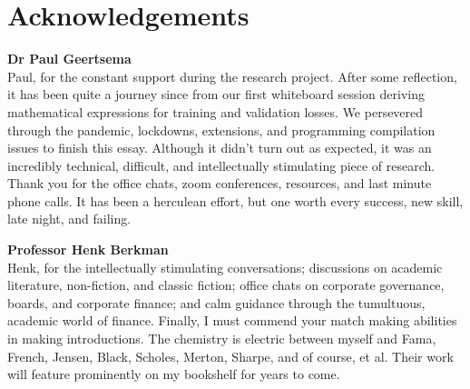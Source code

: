 \documentclass[12pt]{article}
\begin{document}
\section*{Acknowledgements}
\begin{center}
	\textbf{Dr Paul Geertsema}\\
	Paul, for the constant support during the research project.
	After some reflection, it has been quite a journey since from our first whiteboard session deriving mathematical expressions for training and validation losses.
	We persevered through the pandemic, lockdowns, extensions, and programming compilation issues to finish this essay.
	Although it didn't turn out as expected, it was an incredibly technical, difficult,
	and intellectually stimulating piece of research.
	Thank you for the office chats, zoom conferences, resources, and last minute phone calls.
	It has been a herculean effort, but one worth every success, new skill, late night, and failing.
\end{center}
\begin{center}
	\textbf{Professor Henk Berkman}\\
	Henk, for the intellectually stimulating conversations; discussions on academic literature, non-fiction, and classic fiction;
	office chats on corporate governance, boards, and corporate finance; and calm guidance through the tumultuous, academic world of finance.
	Finally, I must commend your match making abilities in making introductions.
	The chemistry is electric between myself and Fama, French, Jensen, Black, Scholes, Merton, Sharpe, and of course, et al.
	Their work will feature prominently on my bookshelf for years to come.
\end{center}
\newpage
\end{document}
